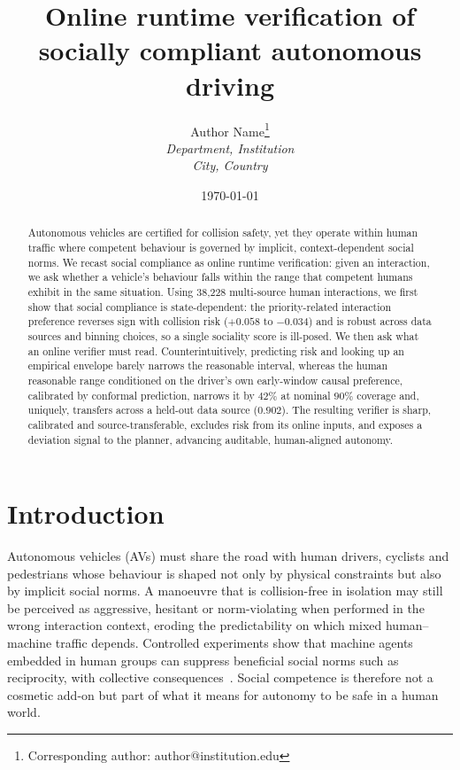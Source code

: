 \documentclass[12pt,a4paper]{article}
\title{Online runtime verification of socially compliant autonomous driving}
\author{
    Author Name\thanks{Corresponding author: author@institution.edu} \\
    \textit{Department, Institution} \\
    \textit{City, Country}
}
\date{\today}
\begin{document}
\maketitle

\begin{abstract}
\noindent
Autonomous vehicles are certified for collision safety, yet they operate within human
traffic where competent behaviour is governed by implicit, context-dependent social norms.
We recast social compliance as online runtime verification: given an interaction, we ask
whether a vehicle's behaviour falls within the range that competent humans exhibit in the
same situation. Using 38{,}228 multi-source human interactions, we first show that social
compliance is state-dependent: the priority-related interaction preference reverses sign
with collision risk ($+0.058$ to $-0.034$) and is robust across data sources and binning
choices, so a single sociality score is ill-posed. We then ask what an online verifier must
read. Counterintuitively, predicting risk and looking up an empirical envelope barely
narrows the reasonable interval, whereas the human reasonable range conditioned on the
driver's own early-window causal preference, calibrated by conformal prediction, narrows it
by $42\%$ at nominal $90\%$ coverage and, uniquely, transfers across a held-out data source
($0.902$). The
resulting verifier is sharp, calibrated and source-transferable, excludes risk from its
online inputs, and exposes a deviation signal to the planner, advancing auditable,
human-aligned autonomy.
\end{abstract}

\section{Introduction}
Autonomous vehicles (AVs) must share the road with human drivers, cyclists and pedestrians
whose behaviour is shaped not only by physical constraints but also by implicit social
norms. A manoeuvre that is collision-free in isolation may still be perceived as aggressive,
hesitant or norm-violating when performed in the wrong interaction context, eroding the
predictability on which mixed human--machine traffic depends. Controlled experiments show
that machine agents embedded in human groups can suppress beneficial social norms such as
reciprocity, with collective consequences~\cite{shirado2023reciprocity}. Social competence
is therefore not a cosmetic add-on but part of what it means for autonomy to be safe in a
human world.
\end{document}
